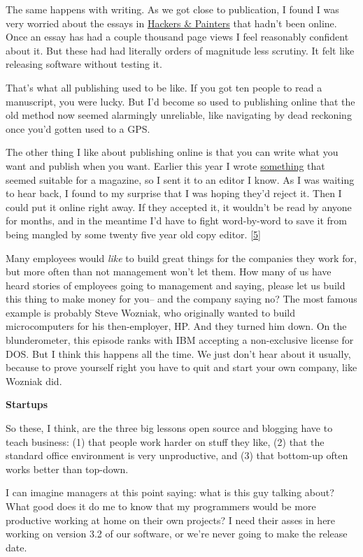The same happens with writing. As we got close to publication, I found I
was very worried about the essays in
\href{http://www.amazon.com/exec/obidos/tg/detail/-/0596006624}{Hackers
\& Painters} that hadn't been online. Once an essay has had a couple
thousand page views I feel reasonably confident about it. But these had
had literally orders of magnitude less scrutiny. It felt like releasing
software without testing it.

That's what all publishing used to be like. If you got ten people to
read a manuscript, you were lucky. But I'd become so used to publishing
online that the old method now seemed alarmingly unreliable, like
navigating by dead reckoning once you'd gotten used to a GPS.

The other thing I like about publishing online is that you can write
what you want and publish when you want. Earlier this year I wrote
\href{inequality.html}{something} that seemed suitable for a magazine,
so I sent it to an editor I know. As I was waiting to hear back, I found
to my surprise that I was hoping they'd reject it. Then I could put it
online right away. If they accepted it, it wouldn't be read by anyone
for months, and in the meantime I'd have to fight word-by-word to save
it from being mangled by some twenty five year old copy editor.
{[}\hyperref[f5n]{5}{]}

Many employees would \emph{like} to build great things for the companies
they work for, but more often than not management won't let them. How
many of us have heard stories of employees going to management and
saying, please let us build this thing to make money for you-- and the
company saying no? The most famous example is probably Steve Wozniak,
who originally wanted to build microcomputers for his then-employer, HP.
And they turned him down. On the blunderometer, this episode ranks with
IBM accepting a non-exclusive license for DOS. But I think this happens
all the time. We just don't hear about it usually, because to prove
yourself right you have to quit and start your own company, like Wozniak
did.

\textbf{Startups}

So these, I think, are the three big lessons open source and blogging
have to teach business: (1) that people work harder on stuff they like,
(2) that the standard office environment is very unproductive, and (3)
that bottom-up often works better than top-down.

I can imagine managers at this point saying: what is this guy talking
about? What good does it do me to know that my programmers would be more
productive working at home on their own projects? I need their asses in
here working on version 3.2 of our software, or we're never going to
make the release date.

